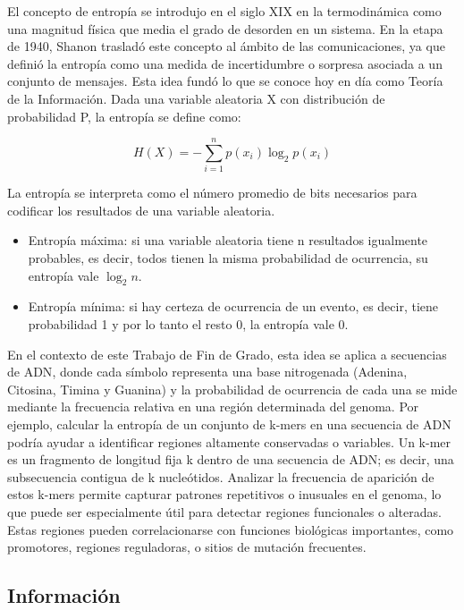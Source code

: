 \documentclass[11pt,spanish,listoffigures,listoftables]{tfgetsinf}
\begin{document}
El concepto de entropía se introdujo en el siglo XIX en la termodinámica como una magnitud física que media el grado de desorden en un sistema. En la etapa de 1940, Shanon trasladó este concepto al ámbito de las comunicaciones, ya que definió la entropía como una medida de incertidumbre o sorpresa asociada a un conjunto de mensajes\cite[p.~4]{ROB}. Esta idea fundó lo que se conoce hoy en día como Teoría de la Información. Dada una variable aleatoria X con distribución de probabilidad P, la entropía se define como: 

\[
H(X) = - \sum_{i=1}^{n} p(x_i) \log_2 p(x_i)
\]

La entropía se interpreta como el número promedio de bits necesarios para codificar los resultados de una variable aleatoria. 

\begin{itemize}
   \item Entropía máxima: si una variable aleatoria tiene n resultados igualmente probables, es decir, todos tienen la misma probabilidad de ocurrencia, su entropía vale \( \log_2 n \). 
   \item Entropía mínima: si hay certeza de ocurrencia de un evento, es decir, tiene probabilidad 1 y por lo tanto el resto 0, la entropía vale 0.
\end{itemize}
 
En el contexto de este Trabajo de Fin de Grado, esta idea se aplica a secuencias de \acs{ADN}, donde cada símbolo representa una base nitrogenada (Adenina, Citosina, Timina y Guanina) y la probabilidad de ocurrencia de cada una se mide mediante la frecuencia relativa en una región determinada del genoma. Por ejemplo, calcular la entropía de un conjunto de k-mers en una secuencia de \acs{ADN} podría ayudar a identificar regiones altamente conservadas o variables. Un k-mer es un fragmento de longitud fija k dentro de una secuencia de ADN; es decir, una subsecuencia contigua de k nucleótidos. Analizar la frecuencia de aparición de estos k-mers permite capturar patrones repetitivos o inusuales en el genoma, lo que puede ser especialmente útil para detectar regiones funcionales o alteradas. Estas regiones pueden correlacionarse con funciones biológicas importantes, como promotores, regiones reguladoras, o sitios de mutación frecuentes. 

\subsection{Información}
\end{document}
